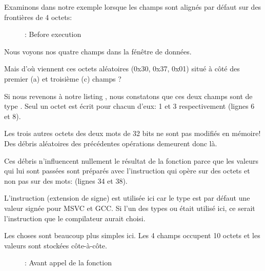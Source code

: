 ﻿\clearpage
{}
\myindex{\olly}

Examinons dans \olly notre exemple lorsque les champs sont alignés par défaut sur des frontières de 4 octets:

\begin{figure}[H]
\centering
{}
\caption{\olly: Before \printf execution}
\label{fig:packing_olly_4}
\end{figure}

Nous voyons nos quatre champs dans la fénêtre de données.

Mais d'où viennent ces octets aléatoires (0x30, 0x37, 0x01) situé à côté des premier (a) et troisième (c)
champs ?

Si nous revenons à notre listing , nous constatons que ces deux champs sont de
type \Tchar. Seul un octet est écrit pour chacun d'eux: 1 et 3 respectivement (lignes 6 et 8).

Les trois autres octets des deux mots de 32 bits ne sont pas modifiés en mémoire! Des débris aléatoires des 
précédentes opérations demeurent donc là.


Ces débris n'influencent nullement le résultat de la fonction \printf parce que les valeurs qui lui sont 
passées sont préparés avec l'instruction \MOVSX qui opère sur des octets et non pas sur des mots: 
 (lignes 34 et 38).

L'instruction \MOVSX (extension de signe) est utilisée ici car le type \Tchar est par défaut une valeur 
signée pour MSVC et GCC. Si l'un des types  ou  était utilisé ici, ce serait 
l'instruction \MOVZX que le compilateur aurait choisi.

\clearpage
{}
\myindex{\olly}

Les choses sont beaucoup plus simples ici. Les 4 champs occupent 10 octets et les valeurs sont stockées 
côte-à-côte.

\begin{figure}[H]
\centering
{}
\caption{\olly: Avant appel de la fonction \printf}
\label{fig:packing_olly_1}
\end{figure}
